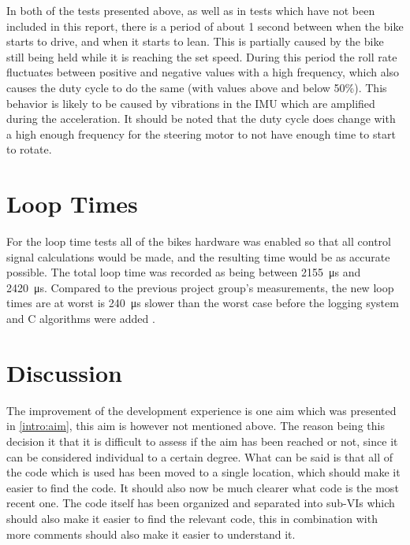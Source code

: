 In both of the tests presented above, as well as in tests which have not been included in this report, there is a period of about 1 second between when the bike starts to drive, and when it starts to lean. This is partially caused by the bike still being held while it is reaching the set speed. During this period the roll rate fluctuates between positive and negative values with a high frequency, which also causes the duty cycle to do the same (with values above and below 50\%). This behavior is likely to be caused by vibrations in the IMU which are amplified during the acceleration. It should be noted that the duty cycle does change with a high enough frequency for the steering motor to not have enough time to start to rotate.

\section{Loop Times}

For the loop time tests all of the bikes hardware was enabled so that all control signal calculations would be made, and the resulting time would be as accurate possible. The total loop time was recorded as being between \SI{2155}{\micro\second} and \SI{2420}{\micro\second}. Compared to the previous project group's measurements, the new loop times are at worst is \SI{240}{\micro\second} slower than the worst case before the logging system and C algorithms were added \cite{AronssonKarlsson2022PROJECTAUTOBIKE}.

\section{Discussion}

The improvement of the development experience is one aim which was presented in \ref{intro:aim}, this aim is however not mentioned above. The reason being this decision it that it is difficult to assess if the aim has been reached or not, since it can be considered individual to a certain degree. What can be said is that all of the code which is used has been moved to a single location, which should make it easier to find the code. It should also now be much clearer what code is the most recent one. The code itself has been organized and separated into sub-VIs which should also make it easier to find the relevant code, this in combination with more comments should also make it easier to understand it.

